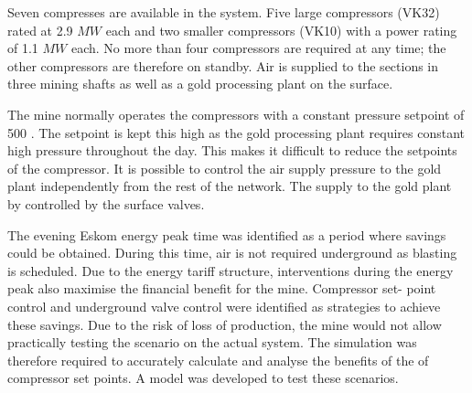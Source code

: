 \par 
 Seven compresses are available in the system. Five large compressors (VK32) rated at 2.9 $MW$ each and two smaller compressors (VK10) with a power rating of 1.1 $MW$ each. No more than four compressors are required at any time; the other compressors are therefore on standby. Air is supplied to the sections in three mining shafts as well as a gold processing plant on the surface. 
 \par 
 The mine normally operates the compressors with a constant pressure setpoint of 500 . The setpoint is kept this high as the gold processing plant requires constant high pressure throughout the day. This makes it difficult to reduce the setpoints of the compressor. It is possible to control the air supply pressure to the gold plant independently from the rest of the network. The supply to the gold plant by controlled by the surface valves.
 \par 
 The evening Eskom energy peak time was identified as a period where savings could be obtained. During this time, air is not required underground as blasting is scheduled. Due to the energy tariff structure, interventions during the energy peak also maximise the financial benefit for the mine. Compressor set- point control and underground valve control were identified as strategies to achieve these savings. Due to the risk of loss of production, the mine would not allow practically testing the scenario on the actual system. The simulation was therefore required to accurately calculate and analyse the benefits of the of compressor set points. A model was developed to test these scenarios.


